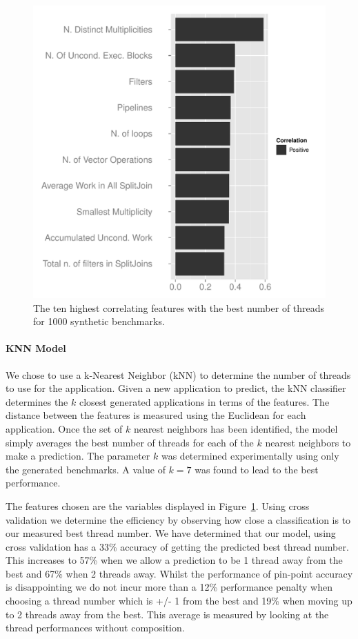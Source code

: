 \begin{figure}
  \includegraphics[width=1\textwidth]{streamit-paper/graphics/corrGraph.pdf}
  \caption{The ten highest correlating features with the best number of threads for 1000 synthetic benchmarks.}\label{fig:corr}
\end{figure}
 
\paragraph{KNN Model}

We chose to use a k-Nearest Neighbor (kNN) to determine the number of threads to use for the application.
Given a new application to predict, the kNN classifier determines the $k$ closest generated applications in terms of the features.
The distance between the features is measured using the Euclidean for each application.
Once the set of $k$ nearest neighbors has been identified, the model simply averages the best number of threads for each of the $k$ nearest neighbors to make a prediction.
The parameter $k$ was determined experimentally using only the generated benchmarks.
A value of $k=7$ was found to lead to the best performance.

The features chosen are the variables displayed in Figure~\ref{fig:corr}.
Using cross validation we determine the efficiency by observing how close a classification is to our measured best thread number.
We have determined that our model, using cross validation has a 33\% accuracy of getting the predicted best thread number.
This increases to 57\% when we allow a prediction to be 1 thread away from the best and 67\% when 2 threads away.
Whilst the performance of pin-point accuracy is disappointing we do not incur more than a 12\% performance penalty when choosing a thread number which is +/- 1 from the best and 19\% when moving up to 2 threads away from the best.
This average is measured by looking at the thread performances without composition.

